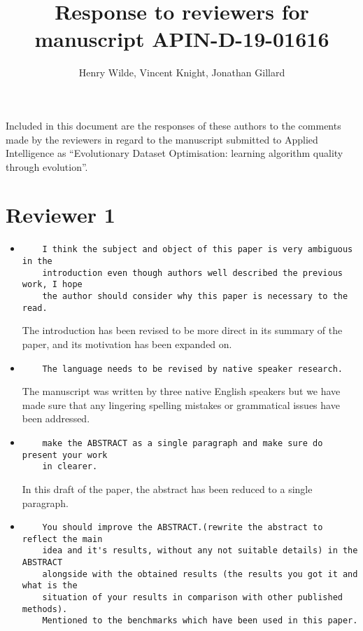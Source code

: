 \documentclass[11pt]{article}
\title{Response to reviewers for manuscript APIN-D-19-01616}
\author{Henry Wilde, Vincent Knight, Jonathan Gillard}
\date{}
\begin{document}
\maketitle%

Included in this document are the responses of these authors to the comments
made by the reviewers in regard to the manuscript submitted to Applied
Intelligence as ``Evolutionary Dataset Optimisation: learning algorithm quality
through evolution''.

\section*{Reviewer 1}

\begin{itemize}

\item
\begin{verbatim}
    I think the subject and object of this paper is very ambiguous in the
    introduction even though authors well described the previous work, I hope
    the author should consider why this paper is necessary to the read.
\end{verbatim}

The introduction has been revised to be more direct in its summary of the paper,
and its motivation has been expanded on.


\item
\begin{verbatim}
    The language needs to be revised by native speaker research.
\end{verbatim}

The manuscript was written by three native English speakers but we have made
sure that any lingering spelling mistakes or grammatical issues have been
addressed.

\item
\begin{verbatim}
    make the ABSTRACT as a single paragraph and make sure do present your work
    in clearer.
\end{verbatim}

In this draft of the paper, the abstract has been reduced to a single paragraph.


\item
\begin{verbatim}
    You should improve the ABSTRACT.(rewrite the abstract to reflect the main
    idea and it's results, without any not suitable details) in the ABSTRACT
    alongside with the obtained results (the results you got it and what is the
    situation of your results in comparison with other published methods).
    Mentioned to the benchmarks which have been used in this paper.
\end{verbatim}


\end{itemize}
\end{document}
